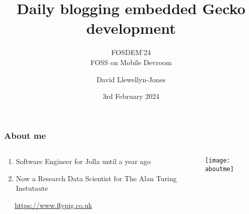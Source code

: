 \documentclass[
	notes=none,
	aspectratio=169
]{beamer}
\begin{document}
\title{Daily blogging embedded Gecko development}
\subtitle{FOSDEM'24\\FOSS on Mobile Devroom}
\author{David Llewellyn-Jones}
\date{3rd February 2024}


\renewcommand{\thefootnote}{\arabic{footnote}}

\frame{
\titlepage
}
\note{
}

\renewcommand{\thefootnote}{\fnsymbol{footnote}}


\begin{frame}
\frametitle{About me}

\begin{columns}[T]
\begin{column}[T]{0.4\textwidth}
\setlength{\parskip}{0.5em}

\vspace{1.0cm}
\begin{enumerate}
\setlength{\parskip}{0.5em}
\item Software Engineer for Jolla until a year ago
\item Now a Research Data Scientist for The Alan Turing Instutaute
\end{enumerate}
\ \ \ \url{https://www.flypig.co.uk}

\end{column}
\begin{column}[T]{0.6\textwidth}
\setlength{\parskip}{0.5em}

\vspace{0.5cm}
\begin{center}
\texttt{[image: aboutme]}
\end{center}

\end{column}
\end{columns}

\end{frame}

\end{document}

